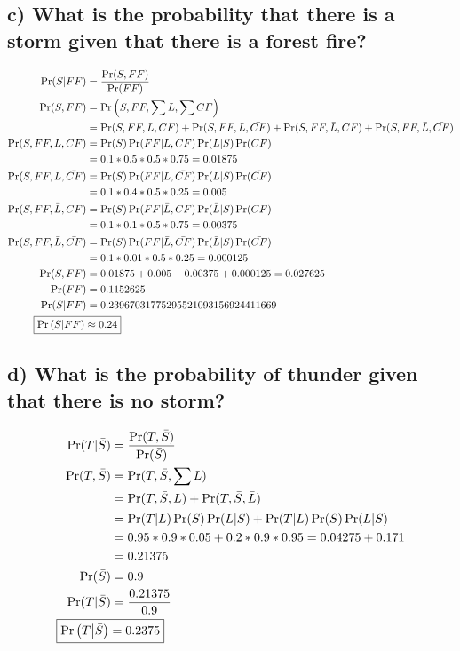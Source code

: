 \documentclass[12pt,letterpaper]{article}
\begin{document}
\subsection{c) What is the probability that there is a storm given that there is a forest fire?}
\begin{align*}
\Pr(S|FF) &= \frac{\Pr(S,FF)}{\Pr(FF)}\\
\Pr(S,FF) &= \Pr\left(S,FF,\sum{L},\sum{CF}\right)\\
&= \Pr(S,FF,L,CF) + \Pr(S,FF,L,\bar{CF}) + \Pr(S,FF,\bar{L},CF) + \Pr(S,FF,\bar{L},\bar{CF})\\
\Pr(S,FF,L,CF) &= \Pr(S)\Pr(FF|L,CF)\Pr(L|S)\Pr(CF)\\
&= 0.1*0.5*0.5*0.75 = 0.01875\\
\Pr(S,FF,L,\bar{CF}) &= \Pr(S)\Pr(FF|L,\bar{CF})\Pr(L|S)\Pr(\bar{CF})\\
&= 0.1*0.4*0.5*0.25 = 0.005\\
\Pr(S,FF,\bar{L},CF) &= \Pr(S)\Pr(FF|\bar{L},CF)\Pr(\bar{L}|S)\Pr(CF)\\
&= 0.1*0.1*0.5*0.75 = 0.00375\\
\Pr(S,FF,\bar{L},\bar{CF}) &= \Pr(S)\Pr(FF|\bar{L},\bar{CF})\Pr(\bar{L}|S)\Pr(\bar{CF})\\
&= 0.1*0.01*0.5*0.25 = 0.000125\\
\Pr(S,FF) &= 0.01875+0.005+0.00375+0.000125=0.027625\\
\Pr(FF) &= 0.1152625\\
\Pr(S|FF) &= 0.23967031775295521093156924411669\\
\Aboxed{\Pr\left(S\middle|FF\right) &\approx 0.24}
\end{align*}
\subsection{d) What is the probability of thunder given that there is no storm?}
\begin{align*}
\Pr(T|\bar{S}) &= \frac{\Pr(T,\bar{S})}{\Pr(\bar{S})}\\
\Pr(T,\bar{S}) &= \Pr(T,\bar{S},\sum{L})\\
&= \Pr(T,\bar{S},L) + \Pr(T,\bar{S},\bar{L})\\
&= \Pr(T|L)\Pr(\bar{S})\Pr(L|\bar{S}) + \Pr(T|\bar{L})\Pr(\bar{S})\Pr(\bar{L}|\bar{S})\\
&= 0.95*0.9*0.05 + 0.2*0.9*0.95 = 0.04275 + 0.171\\
&= 0.21375\\
\Pr(\bar{S}) &= 0.9\\
\Pr(T|\bar{S}) &= \frac{0.21375}{0.9}\\
\Aboxed{\Pr\left(T\middle|\bar{S}\right) &= 0.2375}
\end{align*}
\end{document}

